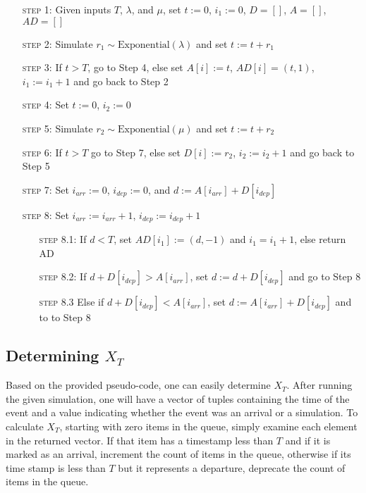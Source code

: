 \documentclass[11pt, oneside]{article}
\begin{document}
\begin{enumerate}[leftmargin=30pt, labelindent=65pt, itemindent=30pt]
\item[\textsc{step 1:}] Given inputs $T$, $\lambda$, and $\mu$, set $t:=0$, $i_1:=0$, $D=[]$, $A=[]$, $AD=[]$
\item[\textsc{step 2:}] Simulate $r_1 \sim \text{Exponential} (\lambda)$ and set $t:=t+r_1$
\item[\textsc{step 3:}] If $t > T$, go to Step 4, else set $A[i]:=t$, $AD[i] = (t,1)$, $i_1:=i_1+1$ and go back to Step 2
\item[\textsc{step 4:}] Set $t:=0$, $i_2:=0$
\item[\textsc{step 5:}] Simulate $r_2 \sim \text{Exponential} (\mu)$ and set $t:=t+r_2$
\item[\textsc{step 6:}] If $t>T$ go to Step 7, else set $D[i]:=r_2$, $i_2:=i_2+1$ and go back to Step 5
\item[\textsc{step 7:}] Set $i_{arr}:=0$, $i_{dep}:=0$, and $d:=A[i_{arr}] + D[i_{dep}]$
\item[\textsc{step 8:}] Set $i_{arr}:=i_{arr}+1$, $i_{dep}:=i_{dep}+1$
\begin{enumerate}[leftmargin=25pt, labelindent=65pt, itemindent=25pt]
\item[\textsc{step 8.1:}] If $d < T$, set $AD[i_1]:= (d,-1)$ and $i_1=i_1+1$, else return AD
\item[\textsc{step 8.2:}] If $d + D[i_{dep}] > A[i_{arr}]$, set $d:=d+D[i_{dep}]$ and go to Step 8
\item[\textsc{step 8.3}] Else if $d + D[i_{dep}] < A[i_{arr}]$, set $d:=A[i_{arr}] + D[i_{dep}]$ and to to Step 8
\end{enumerate}
\end{enumerate}

\subsection{Determining $X_T$}
Based on the provided pseudo-code, one can easily determine $X_T$. After running the given simulation, one will have a vector of tuples containing the time of the event and a value indicating whether the event was an arrival or a simulation. To calculate $X_T$, starting with zero items in the queue, simply examine each element in the returned vector. If that item has a timestamp less than $T$ and if it is marked as an arrival, increment the count of items in the queue, otherwise if its time stamp is less than $T$ but it represents a departure, deprecate the count of items in the queue.
\end{document}
